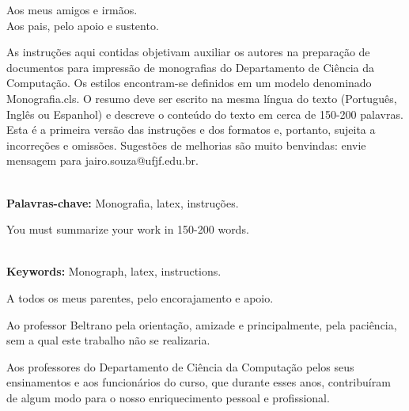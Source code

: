 \documentclass[a4paper,12pt]{monografia}
\theoremstyle{plain}
\theoremstyle{definition}
\theoremstyle{remark}
\begin{document}




\begin{dedicatoria}
Aos meus amigos e irmãos.\\
Aos pais, pelo apoio e sustento.\\
\end{dedicatoria}


 As instruções aqui contidas objetivam auxiliar os autores na preparação de documentos para impressão de monografias do Departamento de Ciência da Computação. Os estilos encontram-se definidos em um modelo denominado Monografia.cls. O resumo deve ser escrito na mesma língua do texto (Português, Inglês ou Espanhol) e descreve o conteúdo do texto em cerca de 150-200 palavras. Esta é a primeira versão das instruções e dos formatos e, portanto, sujeita a incorreções e omissões. Sugestões de melhorias são muito benvindas: envie mensagem para jairo.souza@ufjf.edu.br.

\noindent \\ \textbf{Palavras-chave:} Monografia, latex, instruções.



 You must summarize your work in 150-200 words.

\noindent \\ \textbf{Keywords:} Monograph, latex, instructions.





 \indent\indent 
A todos os meus parentes, pelo encorajamento e
apoio.

Ao professor Beltrano pela orientação, amizade e
principalmente, pela paciência, sem a qual este trabalho não se
realizaria.


Aos professores do Departamento de Ciência da Computação pelos seus
ensinamentos e aos funcionários do curso, que durante esses anos,
contribuíram de algum modo para o nosso enriquecimento pessoal e
profissional.
\newpage
\end{document}
